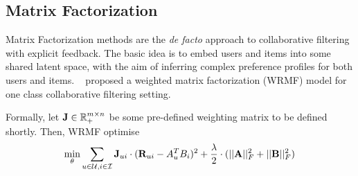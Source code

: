 \subsection{Matrix Factorization}

Matrix Factorization methods are the \emph{de facto} approach to collaborative filtering with explicit feedback. The basic idea is to embed users and items into some shared latent space, with the aim of inferring complex preference profiles for both users and items. ~\cite{Hu:2008, Pan:2009} proposed a weighted matrix factorization (WRMF) model for one class collaborative filtering setting.

Formally, let $\mathbf{J} \in \mathbb{R}_+^{m \times n}$ be some pre-defined weighting matrix to be defined shortly. Then, WRMF optimise
\begin{equation}
\label{eqn:wrmf}
\min_{ \theta } \sum_{ u \in \mathcal{U}, i \in \mathcal{I} } \mathbf{J}_{ui} \cdot ( \mathbf{R}_{ui} - A_u^T B_i )^2 + \frac{\lambda}{2} \cdot ( ||\mathbf{A}||_F^2 + ||\mathbf{B}||_F^2 )
\end{equation}


